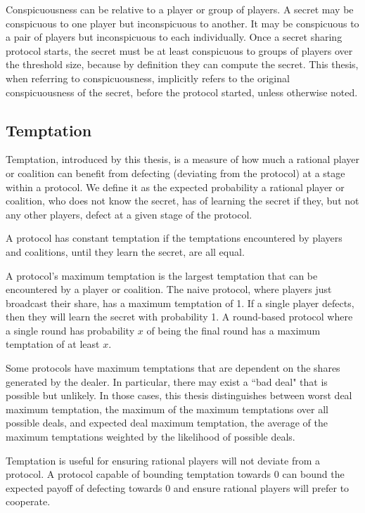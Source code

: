 \documentclass[12pt]{dalcsthesis}
\begin{document}
Conspicuousness can be relative to a player or group of players. A secret may be conspicuous to one player but inconspicuous to another. It may be conspicuous to a pair of players but inconspicuous to each individually. Once a secret sharing protocol starts, the secret must be at least conspicuous to groups of players over the threshold size, because by definition they can compute the secret. This thesis, when referring to conspicuousness, implicitly refers to the original conspicuousness of the secret, before the protocol started, unless otherwise noted.

\subsection{Temptation}

Temptation, introduced by this thesis, is a measure of how much a rational player or coalition can benefit from defecting (deviating from the protocol) at a stage within a protocol. We define it as the expected probability a rational player or coalition, who does not know the secret, has of learning the secret if they, but not any other players, defect at a given stage of the protocol.

A protocol has constant temptation if the temptations encountered by players and coalitions, until they learn the secret, are all equal.

A protocol's maximum temptation is the largest temptation that can be encountered by a player or coalition. The naive protocol, where players just broadcast their share, has a maximum temptation of 1. If a single player defects, then they will learn the secret with probability 1. A round-based protocol where a single round has probability $x$ of being the final round has a maximum temptation of at least $x$.

Some protocols have maximum temptations that are dependent on the shares generated by the dealer. In particular, there may exist a ``bad deal" that is possible but unlikely. In those cases, this thesis distinguishes between worst deal maximum temptation, the maximum of the maximum temptations over all possible deals, and expected deal maximum temptation, the average of the maximum temptations weighted by the likelihood of possible deals.

Temptation is useful for ensuring rational players will not deviate from a protocol. A protocol capable of bounding temptation towards 0 can bound the expected payoff of defecting towards 0 and ensure rational players will prefer to cooperate.
\end{document}
